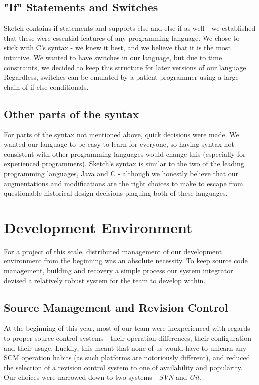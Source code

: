 \documentclass{l3proj}
\begin{document}
\section {"If" Statements and Switches}
Sketch contains if statements and supports else and else-if as well - we established that these were essential features of any programming language. We chose to stick with C's syntax - we knew it best, and we believe that it is the most intuitive. We wanted to have switches in our language, but due to time constraints, we decided to keep this structure for later versions of our language. Regardless, switches can be emulated by a patient programmer using a large chain of if-else conditionals.

\section{Other parts of the syntax}
For parts of the syntax not mentioned above, quick decisions were made. We wanted our language to be easy to learn for everyone, so having syntax not consistent with other programming languages would change this (especially for experienced programmers). Sketch's syntax is similar to the two of the leading programming languages, Java and C - although we honestly believe that our augmentations and modifications are the right choices to make to escape from questionable historical design decisions plaguing both of these languages. 

\chapter{Development Environment}
\label{dev}
For a project of this scale, distributed management of our development environment from the beginning was an absolute necessity. To keep source code management, building and recovery a simple process our system integrator devised a relatively robust system for the team to develop within.
\section{Source Management and Revision Control}
\label{dev-scm}
At the beginning of this year, most of our team were inexperienced with regards to proper source control systems - their operation differences, their configuration and their usage. Luckily, this meant that none of us would have to unlearn any SCM operation habits (as such platforms are notoriously different), and reduced the selection of a revision control system to one of availability and popularity. Our choices were narrowed down to two systems - \textit{SVN} and \textit{Git}.
\end{document}

